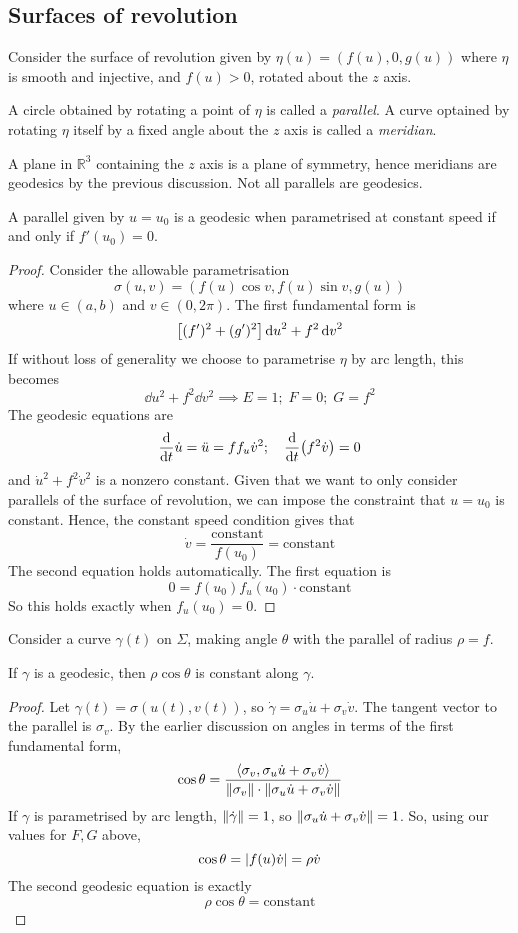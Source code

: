 \subsection{Surfaces of revolution}
Consider the surface of revolution given by \( \eta(u) = (f(u), 0, g(u)) \) where \( \eta \) is smooth and injective, and \( f(u) > 0 \), rotated about the \( z \) axis.
\begin{definition}
	A circle obtained by rotating a point of \( \eta \) is called a \textit{parallel}.
	A curve optained by rotating \( \eta \) itself by a fixed angle about the \( z \) axis is called a \textit{meridian}.
\end{definition}
A plane in \( \mathbb R^3 \) containing the \( z \) axis is a plane of symmetry, hence meridians are geodesics by the previous discussion.
Not all parallels are geodesics.
\begin{lemma}
	A parallel given by \( u = u_0 \) is a geodesic when parametrised at constant speed if and only if \( f'(u_0) = 0 \).
\end{lemma}
\begin{proof}
	Consider the allowable parametrisation
	\[
		\sigma(u,v) = (f(u) \cos v, f(u) \sin v, g(u))
	\]
	where \( u \in (a,b) \) and \( v \in (0,2\pi) \).
	The first fundamental form is
	\[
		\qty[ (f')^2 + (g')^2 ] \dd{u}^2 + f^2 \dd{v}^2
	\]
	If without loss of generality we choose to parametrise \( \eta \) by arc length, this becomes
	\[
		\dd{u}^2 + f^2 \dd{v}^2 \implies E = 1;\;F = 0;\;G = f^2
	\]
	The geodesic equations are
	\[
		\dv{t} \dot u = \ddot u = f f_u \dot v^2;\quad \dv{t} \qty(f^2 \dot v) = 0
	\]
	and \( \dot u^2 + f^2 \dot v^2 \) is a nonzero constant.
	Given that we want to only consider parallels of the surface of revolution, we can impose the constraint that \( u = u_0 \) is constant.
	Hence, the constant speed condition gives that
	\[
		\dot v = \frac{\text{constant}}{f(u_0)} = \text{constant}
	\]
	The second equation holds automatically.
	The first equation is
	\[
		0 = f(u_0) f_u(u_0) \cdot \text{constant}
	\]
	So this holds exactly when \( f_u(u_0) = 0 \).
\end{proof}
Consider a curve \( \gamma(t) \) on \( \Sigma \), making angle \( \theta \) with the parallel of radius \( \rho = f \).
\begin{proposition}
	If \( \gamma \) is a geodesic, then \( \rho \cos \theta \) is constant along \( \gamma \).
\end{proposition}
\begin{proof}
	Let \( \gamma(t) = \sigma(u(t),v(t)) \), so \( \dot\gamma = \sigma_u \dot u + \sigma_v \dot v \).
	The tangent vector to the parallel is \( \sigma_v \).
	By the earlier discussion on angles in terms of the first fundamental form,
	\[
		\cos \theta = \frac{\left\langle{\sigma_v, \sigma_u \dot u + \sigma_v \dot v}\right\rangle}{\norm{\sigma_v} \cdot \norm{\sigma_u \dot u + \sigma_v \dot v}}
	\]
	If \( \gamma \) is parametrised by arc length, \( \norm{\dot \gamma} = 1 \), so \( \norm{\sigma_u \dot u + \sigma_v \dot v} = 1 \).
	So, using our values for \( F, G \) above,
	\[
		\cos \theta = \abs{f(u) \dot v} = \rho \dot v
	\]
	The second geodesic equation is exactly
	\[
		\rho \cos \theta = \text{constant}
	\]
\end{proof}
